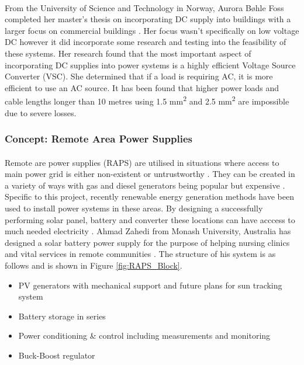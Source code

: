 \paragraph{}
From the University of Science and Technology in Norway, Aurora Bøhle Foss completed her master's thesis on incorporating DC supply into buildings with a larger focus on commercial buildings \cite{Foss2014}. Her focus wasn't specifically on low voltage DC however it did incorporate some research and testing into the feasibility of these systems. Her research found that the most important aspect of incorporating DC supplies into power systems is a highly efficient Voltage Source Converter (VSC). She determined that if a load is requiring AC, it is more efficient to use an AC source. It has been found that higher power loads and cable lengths longer than 10 metres using  1.5 \si{mm^2} and  2.5 \si{mm^2} are impossible due to severe losses.



\subsubsection{Concept: Remote Area Power Supplies}

\paragraph{}
Remote are power supplies (RAPS) are utilised in situations where access to main power grid is either non-existent or untrustworthy \cite{Mendis2010}. They can be created in a variety of ways with gas and diesel generators being popular but expensive \cite{Mendis2010}. Specific to this project, recently renewable energy generation methods have been used to install power systems in these areas. By designing a successfully performing solar panel, battery and converter these locations can have acccess to much needed electricity \cite{Zahedi}. Ahmad Zahedi from Monash University, Australia has designed a solar battery power supply for the purpose of helping nursing clinics and vital services in remote communities \cite{Zahedi}. The structure of his system is as follows and is shown in Figure \ref{fig:RAPS_Block}.

\begin{itemize}[noitemsep]
\item PV generators with mechanical support and future plans for sun tracking system
\item Battery storage in series
\item Power conditioning \& control including measurements and monitoring
\item Buck-Boost regulator
\end{itemize}  

